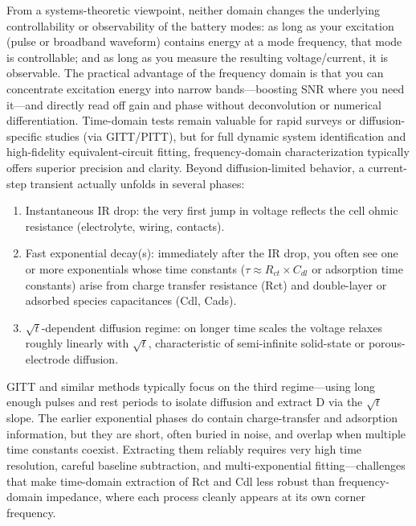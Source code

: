 From a systems-theoretic viewpoint, neither domain changes the underlying controllability or observability of the battery modes: as long as your excitation (pulse or broadband waveform) contains energy at a mode frequency, that mode is controllable; and as long as you measure the resulting voltage/current, it is observable. The practical advantage of the frequency domain is that you can concentrate excitation energy into narrow bands—boosting SNR where you need it—and directly read off gain and phase without deconvolution or numerical differentiation. Time-domain tests remain valuable for rapid surveys or diffusion-specific studies (via GITT/PITT), but for full dynamic system identification and high-fidelity equivalent-circuit fitting, frequency-domain characterization typically offers superior precision and clarity.
Beyond diffusion-limited behavior, a current-step transient actually unfolds in several phases:

\begin{enumerate}
\item Instantaneous IR drop: the very first jump in voltage reflects the cell ohmic resistance (electrolyte, wiring, contacts).
\item Fast exponential decay(s): immediately after the IR drop, you often see one or more exponentials whose time constants ($\tau \approx R_{ct} \times C_{dl} $ or adsorption time constants) arise from charge transfer resistance (Rct) and double-layer or adsorbed species capacitances (Cdl, Cads).
\item $\sqrt{t}$-dependent diffusion regime: on longer time scales the voltage relaxes roughly linearly with $\sqrt{t}$, characteristic of semi-infinite solid-state or porous-electrode diffusion.
\end{enumerate}
GITT and similar methods typically focus on the third regime—using long enough pulses and rest periods to isolate diffusion and extract D via the $\sqrt{t}$ slope. The earlier exponential phases do contain charge-transfer and adsorption information, but they are short, often buried in noise, and overlap when multiple time constants coexist. Extracting them reliably requires very high time resolution, careful baseline subtraction, and multi-exponential fitting—challenges that make time-domain extraction of Rct and Cdl less robust than frequency-domain impedance, where each process cleanly appears at its own corner frequency.

